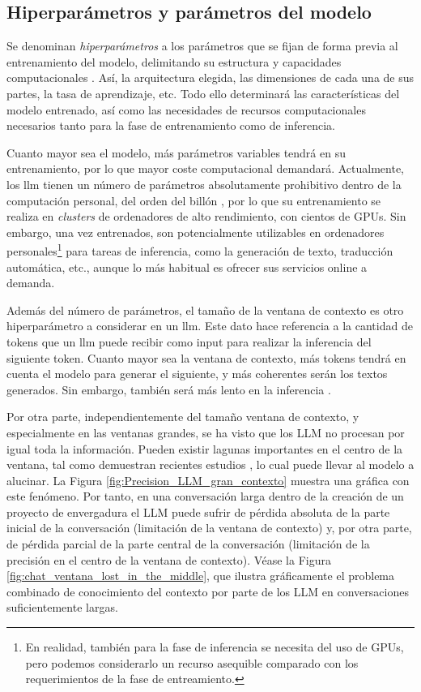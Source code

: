 \subsection{Hiperparámetros y parámetros del modelo}
\label{sec:hiperparametros_ventana}


Se denominan \emph{hiperparámetros} a los parámetros que se fijan de forma previa al entrenamiento del modelo, delimitando su estructura y capacidades computacionales \citep{QueEsAjuste}. Así, la arquitectura elegida, las dimensiones de cada una de sus partes, la tasa de aprendizaje, etc. Todo ello determinará las características del modelo entrenado, así como las necesidades de recursos computacionales necesarios tanto para la fase de entrenamiento como de inferencia.

Cuanto mayor sea el modelo, más parámetros variables tendrá en su entrenamiento, por lo que mayor coste computacional demandará. Actualmente, los \gls{llm} tienen un número de parámetros absolutamente prohibitivo dentro de la computación personal, del orden del billón \citep{radfordLanguageModelsAre2019}, por lo que su entrenamiento se realiza en \emph{clusters} de ordenadores de alto rendimiento, con cientos de GPUs. Sin embargo, una vez entrenados, son potencialmente utilizables en ordenadores personales\footnote{En realidad, también para la fase de inferencia se necesita del uso de GPUs, pero podemos considerarlo un recurso asequible comparado con los requerimientos de la fase de entreamiento.} para tareas de inferencia, como la generación de texto, traducción automática, etc., aunque lo más habitual es ofrecer sus servicios online a demanda.

Además del número de parámetros, el tamaño de la ventana de contexto es otro hiperparámetro a considerar en un \gls{llm}. Este dato hace referencia a la cantidad de {tokens} que un \gls{llm} puede recibir como input para realizar la inferencia del siguiente {token}. Cuanto mayor sea la ventana de contexto, más tokens tendrá en cuenta el modelo para generar el siguiente, y más coherentes serán los textos generados. Sin embargo, también será más lento en la inferencia \citep{gonzaloAsomandonosVentanaContextual2023}.



Por otra parte, independientemente del tamaño ventana de contexto, y especialmente en las ventanas grandes, se ha visto que los LLM no procesan por igual toda la información. Pueden existir lagunas importantes en el centro de la ventana, tal como demuestran recientes estudios \citep{liuLostMiddleHow2023}, lo cual puede llevar al modelo a alucinar. La Figura \ref{fig:Precision_LLM_gran_contexto} muestra una gráfica con este fenómeno. Por tanto, en una conversación larga dentro de la creación de un proyecto de envergadura el LLM puede sufrir de pérdida absoluta de la parte inicial de la conversación (limitación de la ventana de contexto) y, por otra parte, de pérdida parcial de la parte central de la conversación (limitación de la precisión en el centro de la ventana de contexto). Véase la Figura \ref{fig:chat_ventana_lost_in_the_middle}, que ilustra gráficamente el problema combinado de conocimiento del contexto por parte de los LLM en conversaciones suficientemente largas.


